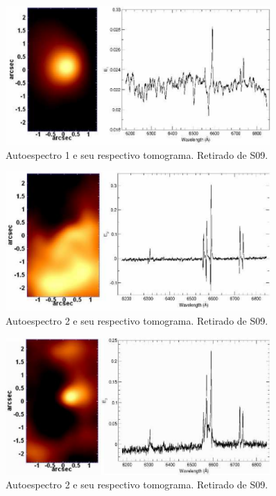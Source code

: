 \begin{figure}
    \includegraphics[width=0.9\textwidth]{figuras/figSteiner2009figA1.pdf}
    \caption[Tomograma e autoespectro 1 da galáxia NGC 4736.]
    {Autoespectro 1 e seu respectivo tomograma. Retirado de S09.}
    \label{fig:S09eigspec1}
\end{figure}

\begin{figure}
    \includegraphics[width=0.9\textwidth]{figuras/figSteiner2009figA2.pdf}
    \caption[Tomograma e autoespectro 2 da galáxia NGC 4736.]
    {Autoespectro 2 e seu respectivo tomograma. Retirado de S09.}
    \label{fig:S09eigspec2}
\end{figure}

\begin{figure}
    \includegraphics[width=0.9\textwidth]{figuras/figSteiner2009figA3.pdf}
    \caption[Tomograma e autoespectro 3 da galáxia NGC 4736.]
    {Autoespectro 2 e seu respectivo tomograma. Retirado de S09.}
    \label{fig:S09eigspec3}
\end{figure}

